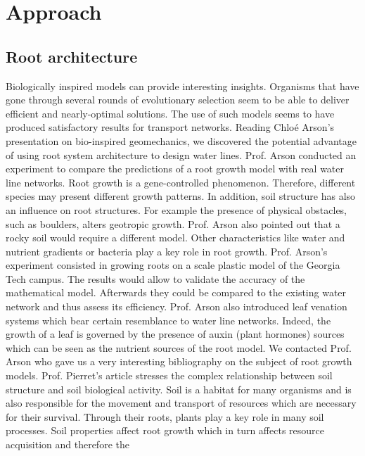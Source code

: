 ﻿
\chapter{Approach}
\label{capitolo3}
\thispagestyle{empty}


\section{Root architecture}



\parindent Biologically inspired models can provide interesting insights. Organisms that have gone
through several rounds of evolutionary selection seem to be able to deliver efficient and
nearly-optimal solutions. The use of such models seems to have produced satisfactory
results for transport networks.
Reading Chloé Arson’s presentation on bio-inspired geomechanics, we discovered the
potential advantage of using root system architecture to design water lines. Prof. Arson
conducted an experiment to compare the predictions of a root growth model with real
water line networks. Root growth is a gene-controlled phenomenon. Therefore, different
species may present different growth patterns. In addition, soil structure has also an influence
on root structures. For example the presence of physical obstacles, such as boulders,
alters geotropic growth. Prof. Arson also pointed out that a rocky soil would require a different model. Other characteristics like water and nutrient gradients or bacteria play
a key role in root growth. Prof. Arson’s experiment consisted in growing roots on a
scale plastic model of the Georgia Tech campus. The results would allow to validate the
accuracy of the mathematical model. Afterwards they could be compared to the existing
water network and thus assess its efficiency. Prof. Arson also introduced leaf venation
systems which bear certain resemblance to water line networks. Indeed, the growth of a
leaf is governed by the presence of auxin (plant hormones) sources which can be seen as
the nutrient sources of the root model.
We contacted Prof. Arson who gave us a very interesting bibliography on the subject
of root growth models. Prof. Pierret’s article stresses the complex relationship between
soil structure and soil biological activity. Soil is a habitat for many organisms and is
also responsible for the movement and transport of resources which are necessary for
their survival. Through their roots, plants play a key role in many soil processes. Soil
properties affect root growth which in turn affects resource acquisition and therefore the
